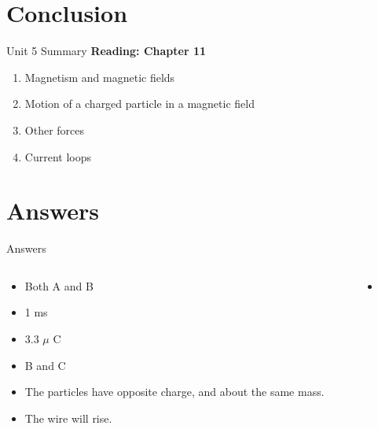 \documentclass{beamer}
\begin{document}
\section{Conclusion}

\begin{frame}{Unit 5 Summary}
\textbf{Reading: Chapter 11}
\begin{enumerate}
\item Magnetism and magnetic fields
\item \alert{Motion of a charged particle in a magnetic field}
\item Other forces
\item Current loops
\end{enumerate}
\end{frame}

\section{Answers}

\begin{frame}{Answers}
\tiny
\begin{columns}[T]
\begin{column}{0.5\textwidth}
\begin{itemize}
\item Both A and B
\item 1 ms
\item 3.3 $\mu$ C
\item B and C
\item The particles have opposite charge, and about the same mass.
\item The wire will rise.
\end{itemize}
\end{column}
\begin{column}{0.5\textwidth}
\begin{itemize}
\item 
\end{itemize}
\end{column}
\end{columns}
\end{frame}
\end{document}
